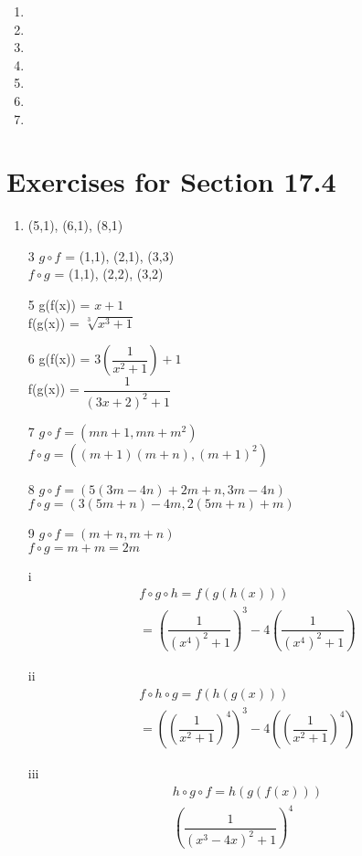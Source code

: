 \documentclass[12pt]{article}
\begin{document}
\begin{enumerate}
	\item 
	\item 
	\item 
	\item 
	\item 
	\item 
	\item 
\end{enumerate}
\section*{Exercises for Section 17.4}
\begin{enumerate}
    \item {(5,1), (6,1), (8,1)}
    \item [3] $g\circ f$ = {(1,1), (2,1), (3,3)}\\
    $f\circ g$ = {(1,1), (2,2), (3,2)}\\
	\item [5] g(f(x)) = $x+1$\\
	    f(g(x)) = $\sqrt[3]{x^3 + 1}$
	\item [6] g(f(x)) = $3(\dfrac{1}{x^2 + 1})+1$\\
	    f(g(x)) = $\dfrac{1}{(3x+2)^2 + 1}$
	\item [7] $g\circ f = (mn + 1,mn + m^2)$\\
    $f\circ g = ((m+1)(m+n), (m+1)^2)$\\
	\item [8] $g\circ f = (5(3m-4n)+2m+n,3m-4n)$\\
    $f\circ g = (3(5m+n)-4m,2(5m+n)+m)$\\
	\item [9] $g\circ f = (m+n,m+n)$\\
    $f\circ g = m+m = 2m$\\
\end{enumerate}
\begin{enumerate}
    \item [i]
	\begin{equation*}
		\begin{split}
			f\circ g \circ h = f(g(h(x)))\\
			= (\dfrac{1}{(x^4)^2 + 1})^3 -4(\dfrac{1}{(x^4)^2 + 1})
		\end{split}
	\end{equation*}
    \item [ii]
	\begin{equation*}
		\begin{split}
			f\circ h \circ g = f(h(g(x)))\\
			= ((\dfrac{1}{x^2 + 1})^4)^3 -4((\dfrac{1}{x^2 + 1})^4)
		\end{split}
	\end{equation*}
    \item [iii]
	\begin{equation*}
		\begin{split}
			h\circ g \circ f = h(g(f(x)))\\
			(\dfrac{1}{(x^3 -4x)^2 + 1})^4
		\end{split}
	\end{equation*}
\end{enumerate}
\end{document}
